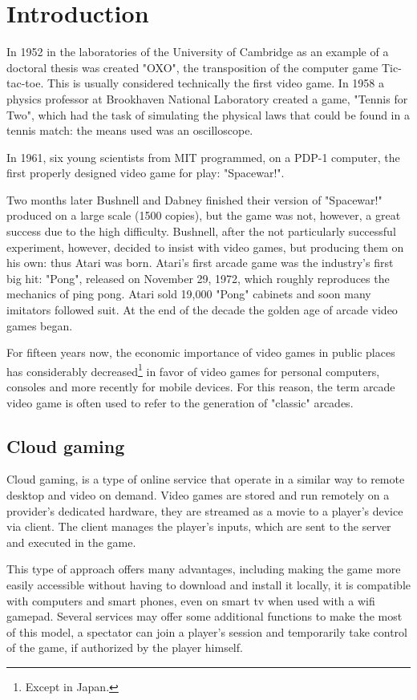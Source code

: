 \chapter{Introduction}
\label{cap:introduction}
In 1952 in the laboratories of the University of Cambridge as an example of a doctoral thesis was created "OXO", the transposition of the computer game Tic-tac-toe. This is usually considered technically the first video game. In 1958 a physics professor at Brookhaven National Laboratory created a game, "Tennis for Two", which had the task of simulating the physical laws that could be found in a tennis match: the means used was an oscilloscope.

In 1961, six young scientists from MIT programmed, on a PDP-1 computer, the first properly designed video game for play: "Spacewar!".

Two months later Bushnell and Dabney finished their version of "Spacewar!" produced on a large scale (1500 copies), but the game was not, however, a great success due to the high difficulty.
Bushnell, after the not particularly successful experiment, however, decided to insist with video games, but producing them on his own: thus Atari was born. Atari's first arcade game was the industry's first big hit: "Pong", released on November 29, 1972, which roughly reproduces the mechanics of ping pong. Atari sold 19,000 "Pong" cabinets and soon many imitators followed suit. At the end of the decade the golden age of arcade video games began.

For fifteen years now, the economic importance of video games in public places has considerably decreased\footnote{Except in Japan.} in favor of video games for personal computers, consoles and more recently for mobile devices. For this reason, the term arcade video game is often used to refer to the generation of "classic" arcades\cite{High_Score}.

\section{Cloud gaming}
Cloud gaming, is a type of online service that operate in a similar way to remote desktop and video on demand. Video games are stored and run remotely on a provider's dedicated hardware, they are streamed as a movie to a player's device via client. The client manages the player's inputs, which are sent to the server and executed in the game.

This type of approach offers many advantages, including making the game more easily accessible without having to download and install it locally, it is compatible with computers and smart phones, even on smart tv when used with a wifi gamepad. Several services may offer some additional functions to make the most of this model, a spectator can join a player's session and temporarily take control of the game, if authorized by the player himself.

